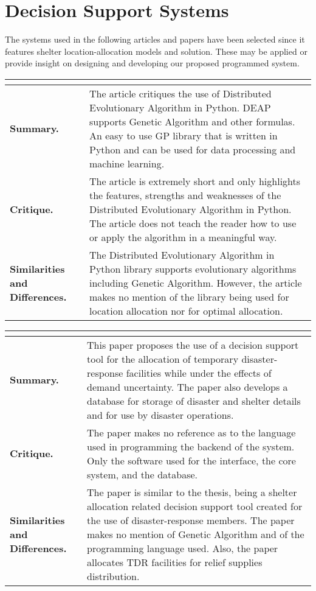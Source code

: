 \section{Decision Support Systems}

The systems used in the following articles and papers have been selected since it features shelter location-allocation models and solution.  These may be applied or provide insight on designing and developing our proposed programmed system.

\begin{longtable}{|L{.2\linewidth}|L{.74\linewidth}|}
	\hline
	\\ \hline
	\textbf{Summary.} & The article critiques the use of Distributed Evolutionary Algorithm in Python.  DEAP supports Genetic Algorithm and other formulas. An easy to use GP library that is written in Python and can be used for data processing and machine learning.\\ \hline
	\textbf{Critique.} & The article is extremely short and only highlights the features, strengths and weaknesses of the Distributed Evolutionary Algorithm in Python. The article does not teach the reader how to use or apply the algorithm in a meaningful way.\\ \hline
	\textbf{Similarities and Differences.} & The Distributed Evolutionary Algorithm in Python library supports evolutionary algorithms including Genetic Algorithm. However, the article makes no mention of the library being used for location allocation nor for optimal allocation. \\ \hline
\end{longtable}

\begin{longtable}{|L{.2\linewidth}|L{.74\linewidth}|}
	\hline
	\\ \hline
	\textbf{Summary.} & This paper proposes the use of a decision support tool for the allocation of temporary disaster-response facilities while under the effects of demand uncertainty.  The paper also develops a database for storage of disaster and shelter details and for use by disaster operations.\\ \hline
	\textbf{Critique.} & The paper makes no reference as to the language used in programming the backend of the system. Only the software used for the interface, the core system, and the database.\\ \hline
	\textbf{Similarities and Differences.} & The paper is similar to the thesis, being a shelter allocation related decision support tool created for the use of disaster-response members. The paper makes no mention of Genetic Algorithm and of the programming language used. Also, the paper allocates TDR facilities for relief supplies distribution.\\ \hline
\end{longtable}

